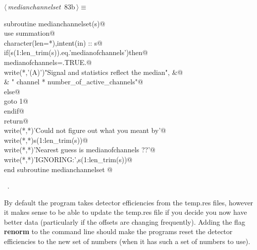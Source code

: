 \documentclass[10pt,a4paper,notitlepage]{article}
\newcommand{\code}[1]{\textbf{\textsf{#1}}} %
\begin{document}
\begin{flushleft} \small
\begin{minipage}{\linewidth}\label{scrap101}\raggedright\small
{} $\langle\,${\it medianchannelset}\nobreak\ {\footnotesize {83b}}$\,\rangle\equiv$
\vspace{-1ex}
\begin{list}{}{} \item
\mbox{}\verb@      subroutine medianchannelset(s)@\\
\mbox{}\verb@      use summation@\\
\mbox{}\verb@      character(len=*),intent(in) :: s@\\
\mbox{}\verb@      if(s(1:len_trim(s)).eq.'medianofchannels')then@\\
\mbox{}\verb@        medianofchannels=.TRUE.@\\
\mbox{}\verb@        write(*,'(A)')"Signal and statistics reflect the median", &@\\
\mbox{}\verb@     & " channel * number_of_active_channels"@\\
\mbox{}\verb@      else@\\
\mbox{}\verb@        goto 1@\\
\mbox{}\verb@      endif@\\
\mbox{}\verb@      return@\\
\mbox{}     write(*,*)'Could not figure out what you meant by'@\\
\mbox{}\verb@      write(*,*)s(1:len_trim(s))@\\
\mbox{}\verb@      write(*,*)'Nearest guess is medianofchannels ??'@\\
\mbox{}\verb@      write(*,*)'IGNORING:',s(1:len_trim(s))@\\
\mbox{}\verb@      end subroutine medianchannelset                                  @{\NWsep}
\end{list}
\vspace{-1.5ex}
\footnotesize
\begin{list}{}{\setlength{\itemsep}{-\parsep}\setlength{\itemindent}{-\leftmargin}}
\item \NWtxtMacroRefIn\ .

\item{}
\end{list}
\end{minipage}\vspace{4ex}
\end{flushleft}
By default the program takes detector efficiencies from the temp.res files,
however it makes sense to be able to update the temp.res file if you decide
you now have better data (particularly if the offsets are changing frequently).
Adding the flag \code{renorm} to the command line should make the programs
reset the detector efficiencies to the new set of numbers (when it has
such a set of numbers to use).
\end{document}
